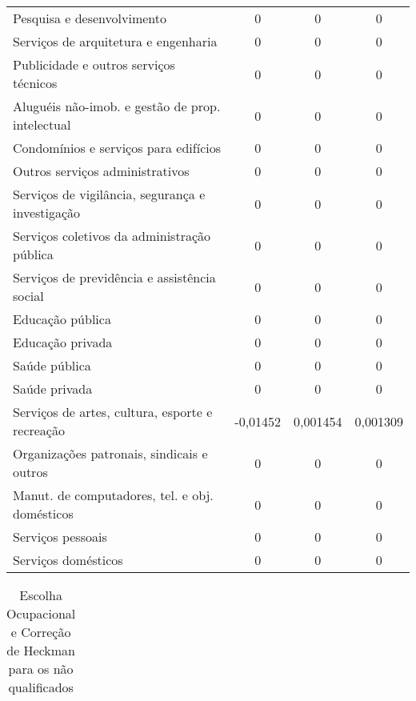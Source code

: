 \begin{apendicesenv}
\begin{small}
\begin{center}
\begin{longtable}{m{8cm}ccc}
				Pesquisa e desenvolvimento                         & 0 & 0 & 0 \\
				Serviços de arquitetura e engenharia               & 0 & 0 & 0 \\
				Publicidade e outros serviços técnicos             & 0 & 0 & 0 \\
				Aluguéis não-imob. e gestão de prop. intelectual   & 0 & 0 & 0 \\
				Condomínios e serviços para edifícios              & 0 & 0 & 0 \\
				Outros serviços administrativos                    & 0 & 0 & 0 \\
				Serviços de vigilância, segurança e investigação   & 0 & 0 & 0 \\
				Serviços coletivos da administração pública        & 0 & 0 & 0 \\
				Serviços de previdência e assistência social       & 0 & 0 & 0 \\
				Educação pública                                   & 0 & 0 & 0 \\
				Educação privada                                   & 0 & 0 & 0 \\
				Saúde pública                                      & 0 & 0 & 0 \\
				Saúde privada                                      & 0 & 0 & 0 \\
				Serviços de artes, cultura, esporte e recreação    & -0,01452 & 0,001454 & 0,001309 \\
				Organizações patronais, sindicais e outros         & 0 & 0 & 0 \\
				Manut. de computadores, tel. e obj. domésticos     & 0 & 0 & 0 \\
				Serviços pessoais                                  & 0 & 0 & 0 \\
				Serviços domésticos                                & 0 & 0 & 0 \\ \hline
			\end{longtable}
		\end{center}
	\end{small}

	\newpage
	
	\begin{footnotesize}
	  \begin{longtable}{@{\extracolsep{5pt}}lD{.}{.}{-3} D{.}{.}{-3} D{.}{.}{-3} }
		\caption{Escolha Ocupacional e Correção de Heckman para os não qualificados}


\end{longtable}
\end{footnotesize}
\end{apendicesenv}
